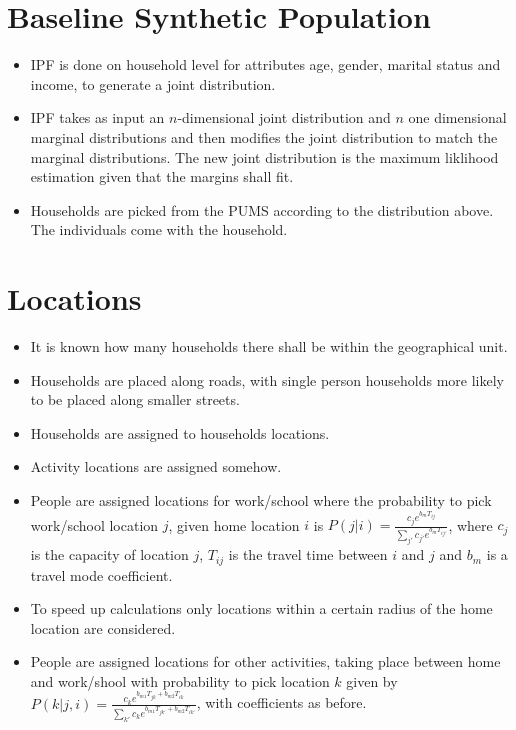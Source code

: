 \documentclass[12pt]{article}
\begin{document}
\section{Baseline Synthetic Population}
\begin{itemize}
\item
IPF is done on household level for attributes age, gender, marital status and
income, to generate a joint distribution.
\item
IPF takes as input an $n$-dimensional joint distribution and $n$ one dimensional
marginal distributions and then modifies the joint distribution to match the
marginal distributions. The new joint distribution is the maximum liklihood
estimation given that the margins shall fit. 
\item
Households are picked from the PUMS according to the distribution above. The
individuals come with the household.
\end{itemize}

\section{Locations}
\begin{itemize}
\item
It is known how many households there shall be within the geographical unit.
\item
Households are placed along roads, with single person households more likely
to be placed along smaller streets.
\item
Households are assigned to households locations.
\item
Activity locations are assigned somehow.
\item
People are assigned locations for work/school where the probability to pick
work/school location $j$, given home location $i$ is $P(j|i) =
\frac{c_je^{b_mT_{ij}}}{\sum_{j'} c_{j'}e^{b_mT_{ij'}}}$, where $c_j$ is the capacity
of location $j$, $T_{ij}$ is the travel time between $i$ and $j$ and $b_m$ is a
travel mode coefficient.
\item
To speed up calculations only locations within a certain radius of the home
location are considered.
\item
People are assigned locations for other activities, taking place between home
and work/shool with probability to pick location $k$ given by $P(k|j,i) =
\frac{c_ke^{b_{m1}T_{jk} + b_{m2}T_{ik}}}{\sum_{k'} c_ke^{b_{m1}T_{jk'} +
b_{m2}T_{ik'}}}$, with coefficients as before.
\end{itemize}
\end{document}
